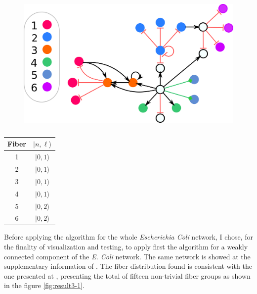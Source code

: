 \documentclass[12pt]{diazessay} %
\begin{document}
\begin{figure}[H]
	\centering
	\includegraphics[scale=0.3]{Figures/result2-label.png}
\end{figure}



\begin{table}[H]
\centering
\begin{tabular}[b]{cc}\hline
	Fiber & $| n, \ell \rangle$  \\ \hline
	1 & $| 0, 1 \rangle$ \\
	2 & $| 0, 1 \rangle$ \\
	3 & $| 0, 1 \rangle$ \\ 
	4 & $| 0, 1 \rangle$ \\
	5 & $| 0, 2 \rangle$ \\
	6 & $| 0, 2 \rangle$ \\ \hline
  \end{tabular}
  \caption{}
  \label{tab:r2}
\end{table}

Before applying the algorithm for the whole \textit{Escherichia Coli} network, I chose, for the finality of visualization and testing, to apply first the algorithm for a weakly connected component of the \textit{E. Coli} network. The same network is showed at the supplementary information of \cite{fibration2019}. The fiber distribution found is consistent with the one presented at \cite{fibration2019}, presenting the total of fifteen non-trivial fiber groups as shown in the figure \ref{fig:result3-1}.
\end{document}

